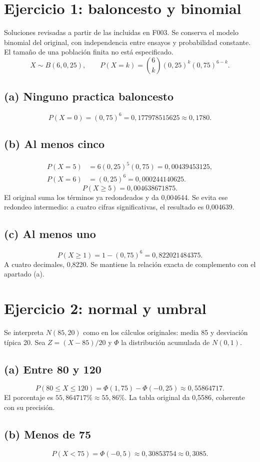 \documentclass[11pt]{article}
\begin{document}
\section*{Ejercicio 1: baloncesto y binomial}
Soluciones revisadas a partir de las incluidas en F003. Se conserva el modelo binomial del original, con independencia entre ensayos y probabilidad constante. El tamaño de una población finita no está especificado.
\[X\sim B(6,0{,}25),\qquad P(X=k)=\binom6k(0{,}25)^k(0{,}75)^{6-k}.\]
\subsection*{(a) Ninguno practica baloncesto}
\[P(X=0)=(0{,}75)^6=\boxed{0{,}177978515625}\approx0{,}1780.\]
\subsection*{(b) Al menos cinco}
\begin{align*}
P(X=5)&=6(0{,}25)^5(0{,}75)=0{,}00439453125,\\
P(X=6)&=(0{,}25)^6=0{,}000244140625.
\end{align*}
\[\boxed{P(X\geq5)=0{,}004638671875}.\]
El original suma los términos ya redondeados y da 0,004644. Se evita ese redondeo intermedio: a cuatro cifras significativas, el resultado es 0,004639.
\subsection*{(c) Al menos uno}
\[P(X\geq1)=1-(0{,}75)^6=\boxed{0{,}822021484375}.\]
A cuatro decimales, 0,8220. Se mantiene la relación exacta de complemento con el apartado (a).
\clearpage
\section*{Ejercicio 2: normal y umbral}
Se interpreta $N(85,20)$ como en los cálculos originales: media 85 y desviación típica 20. Sea $Z=(X-85)/20$ y $\Phi$ la distribución acumulada de $N(0,1)$.
\subsection*{(a) Entre 80 y 120}
\[P(80\leq X\leq120)=\Phi(1{,}75)-\Phi(-0{,}25)\approx0{,}55864717.\]
El porcentaje es $\boxed{55{,}864717\%}\approx55{,}86\%$. La tabla original da 0,5586, coherente con su precisión.
\subsection*{(b) Menos de 75}
\[P(X<75)=\Phi(-0{,}5)\approx\boxed{0{,}30853754}\approx0{,}3085.\]
\end{document}
